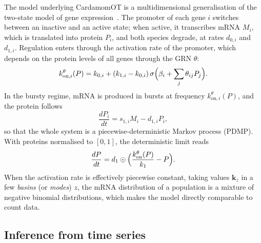 \documentclass[a4paper, 11pt]{article}
\newcommand{\kon}{k_{\mathrm{on}}^{\theta}}
\newcommand{\koni}{k_{\mathrm{on},i}^{\theta}}
\theoremstyle{plain}
\theoremstyle{remark}
\begin{document}
The model underlying CardamomOT is a multidimensional generalisation of the two-state model of gene expression~\cite{peccoud1995markovian, herbachinferring2017}. The promoter of each gene $i$ switches between an inactive and an active state; when active, it transcribes mRNA $M_i$, which is translated into protein $P_i$, and both species degrade, at rates $d_{0,i}$ and $d_{1,i}$. Regulation enters through the activation rate of the promoter, which depends on the protein levels of all genes through the GRN $\theta$:
\begin{equation}\label{eq:kon}
\koni(P) = k_{0,i} + (k_{1,i}-k_{0,i})\,\sigma\Bigl(\beta_i + \sum_j \theta_{ij}P_j\Bigr).
\end{equation}
In the bursty regime, mRNA is produced in bursts at frequency $\koni(P)$, and the protein follows
\begin{equation}\label{eq:prot}
\frac{dP_i}{dt} = s_{1,i}M_i - d_{1,i}P_i ,
\end{equation}
so that the whole system is a piecewise-deterministic Markov process (PDMP). With proteins normalised to $[0,1]$, the deterministic limit reads
\begin{equation}\label{eq:ode}
\frac{dP}{dt} = d_1 \odot \Bigl(\frac{\kon(P)}{k_1} - P\Bigr).
\end{equation}
When the activation rate is effectively piecewise constant, taking values $\mathbf{k}_z$ in a few \emph{basins} (or \emph{modes}) $z$, the mRNA distribution of a population is a mixture of negative binomial distributions, which makes the model directly comparable to count data.

\subsection{Inference from time series}
\end{document}
